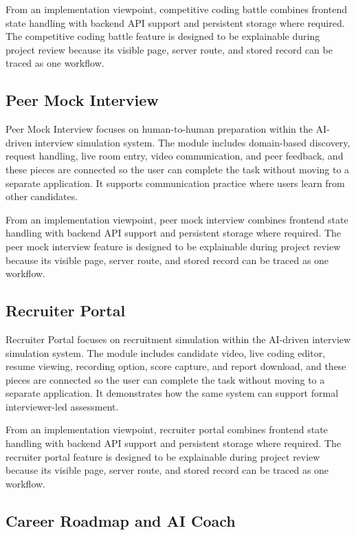 \documentclass[12pt,a4paper]{report}
\begin{document}
From an implementation viewpoint, competitive coding battle combines frontend state handling with backend API support and persistent storage where required. The competitive coding battle feature is designed to be explainable during project review because its visible page, server route, and stored record can be traced as one workflow.

\subsection{Peer Mock Interview}

Peer Mock Interview focuses on human-to-human preparation within the AI-driven interview simulation system. The module includes domain-based discovery, request handling, live room entry, video communication, and peer feedback, and these pieces are connected so the user can complete the task without moving to a separate application. It supports communication practice where users learn from other candidates.

From an implementation viewpoint, peer mock interview combines frontend state handling with backend API support and persistent storage where required. The peer mock interview feature is designed to be explainable during project review because its visible page, server route, and stored record can be traced as one workflow.

\subsection{Recruiter Portal}

Recruiter Portal focuses on recruitment simulation within the AI-driven interview simulation system. The module includes candidate video, live coding editor, resume viewing, recording option, score capture, and report download, and these pieces are connected so the user can complete the task without moving to a separate application. It demonstrates how the same system can support formal interviewer-led assessment.

From an implementation viewpoint, recruiter portal combines frontend state handling with backend API support and persistent storage where required. The recruiter portal feature is designed to be explainable during project review because its visible page, server route, and stored record can be traced as one workflow.

\subsection{Career Roadmap and AI Coach}
\end{document}
